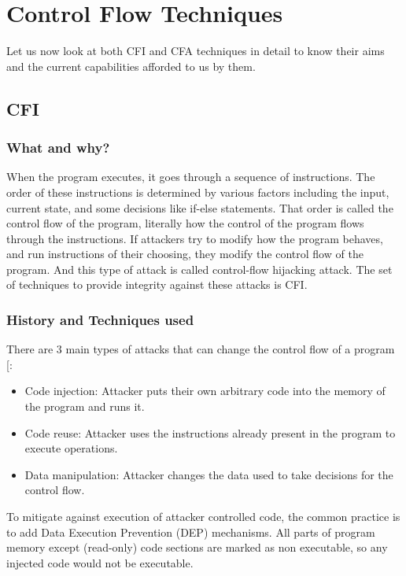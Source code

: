 \documentclass[a4paper, nobind]{templates/ociamthesis}
\providecommand{\tightlist}{%
  \setlength{\itemsep}{0pt}\setlength{\parskip}{0pt}}
\begin{document}
\section{Control Flow Techniques}\label{control-flow-techniques}

Let us now look at both CFI and CFA techniques in detail to know their aims and the current
capabilities afforded to us by them.

\subsection{CFI}\label{cfi}

\subsubsection{What and why?}\label{what-and-why}

When the program executes, it goes through a sequence of instructions. The order
of these instructions is determined by various factors including the input, current state,
and some decisions like if-else statements. That order is called the control flow
of the program, literally how the control of the program flows through the instructions.
If attackers try to modify how the program behaves, and run instructions
of their choosing, they modify the control flow of the program. And this type of attack is
called control-flow hijacking attack.
The set of techniques to provide integrity against these attacks is CFI.

\subsubsection{History and Techniques used}\label{history-and-techniques-used}

There are 3 main types of attacks that can change the control flow of a program {[}\citeproc{ref-sok}{5}{]}:

\begin{itemize}
\tightlist
\item
  Code injection: Attacker puts their own arbitrary code into the memory of the program and runs it.
\item
  Code reuse: Attacker uses the instructions already present in the program to execute operations.
\item
  Data manipulation: Attacker changes the data used to take decisions for the control flow.
\end{itemize}

To mitigate against execution of attacker controlled code, the common practice is
to add Data Execution Prevention (DEP) mechanisms. All parts of program memory except
(read-only) code sections are marked as non executable, so any injected code would not be executable.
\end{document}
